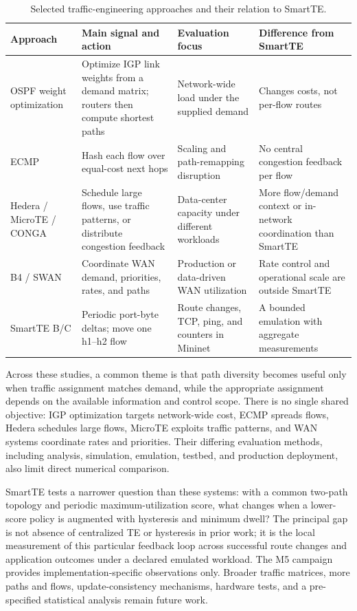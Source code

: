 \begin{table}[!htbp]\centering\small
\caption{Selected traffic-engineering approaches and their relation to SmartTE.}
\label{tab:related-work}
\begin{tabular}{>{\raggedright\arraybackslash}p{2.35cm}>{\raggedright\arraybackslash}p{3.65cm}>{\raggedright\arraybackslash}p{3.25cm}>{\raggedright\arraybackslash}p{4.6cm}}
\toprule
Approach & Main signal and action & Evaluation focus & Difference from SmartTE \\
\midrule
OSPF weight optimization \cite{fortz2000,fortz2002} & Optimize IGP link weights from a demand matrix; routers then compute shortest paths & Network-wide load under the supplied demand & Changes costs, not per-flow routes \\
ECMP \cite{rfc2992} & Hash each flow over equal-cost next hops & Scaling and path-remapping disruption & No central congestion feedback per flow \\
Hedera / MicroTE / CONGA \cite{hedera,microte,conga} & Schedule large flows, use traffic patterns, or distribute congestion feedback & Data-center capacity under different workloads & More flow/demand context or in-network coordination than SmartTE \\
B4 / SWAN \cite{b4,swan} & Coordinate WAN demand, priorities, rates, and paths & Production or data-driven WAN utilization & Rate control and operational scale are outside SmartTE \\
SmartTE B/C & Periodic port-byte deltas; move one h1--h2 flow & Route changes, TCP, ping, and counters in Mininet & A bounded emulation with aggregate measurements \\
\bottomrule
\end{tabular}
\end{table}

Across these studies, a common theme is that path diversity becomes useful only when traffic assignment matches demand, while the appropriate assignment depends on the available information and control scope. There is no single shared objective: IGP optimization targets network-wide cost, ECMP spreads flows, Hedera schedules large flows, MicroTE exploits traffic patterns, and WAN systems coordinate rates and priorities. Their differing evaluation methods, including analysis, simulation, emulation, testbed, and production deployment, also limit direct numerical comparison.

SmartTE tests a narrower question than these systems: with a common two-path topology and periodic maximum-utilization score, what changes when a lower-score policy is augmented with hysteresis and minimum dwell? The principal gap is not absence of centralized TE or hysteresis in prior work; it is the local measurement of this particular feedback loop across successful route changes and application outcomes under a declared emulated workload. The M5 campaign provides implementation-specific observations only. Broader traffic matrices, more paths and flows, update-consistency mechanisms, hardware tests, and a pre-specified statistical analysis remain future work.


